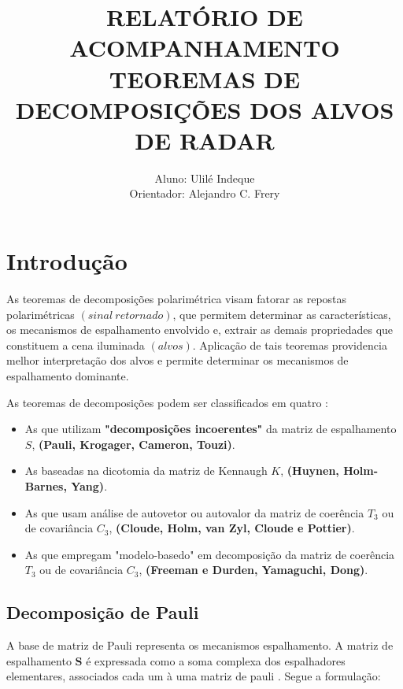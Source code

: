\documentclass{article}
\date{}
\title{RELATÓRIO DE ACOMPANHAMENTO \\ TEOREMAS DE DECOMPOSIÇÕES DOS ALVOS DE RADAR}
\author{Aluno: Ulilé Indeque \\ Orientador: Alejandro C. Frery}
\begin{document}
\maketitle

\section{Introdução} 
\label{sec:Dec}

As teoremas de decomposições polarimétrica visam fatorar as repostas polarimétricas $(sinal \ retornado)$, que permitem determinar as características, os mecanismos de espalhamento envolvido e, extrair as demais propriedades que constituem a cena iluminada $(alvos)$. Aplicação de tais teoremas providencia melhor interpretação dos alvos e permite determinar os mecanismos de espalhamento dominante.

As teoremas de decomposições podem ser classificados em quatro \cite{jong:2009}: 

\begin{itemize}
    \item As que utilizam \textbf{"decomposições incoerentes"} da matriz de espalhamento $S$, \textbf{(Pauli, Krogager, Cameron, Touzi)}.
    
    \item As baseadas na dicotomia da matriz de Kennaugh $K$, \textbf{(Huynen, Holm-Barnes, Yang)}.
    
    \item As que usam análise de autovetor ou autovalor da matriz de coerência $T_{3}$ ou de covariância $C_{3}$, \textbf{(Cloude, Holm, van Zyl, Cloude e Pottier)}.
    
    \item As que empregam "modelo-basedo" em decomposição da matriz de coerência $T_{3}$ ou de covariância $C_{3}$, \textbf{(Freeman e Durden, Yamaguchi, Dong)}.
\end{itemize}

\subsection{\textbf{Decomposição de Pauli}}

A base de matriz de Pauli representa os mecanismos espalhamento. A matriz de espalhamento $\textbf{S}$ é expressada como a soma complexa dos espalhadores elementares, associados cada um à uma matriz de pauli \cite{jong:2009}. Segue a formulação:
\end{document}
